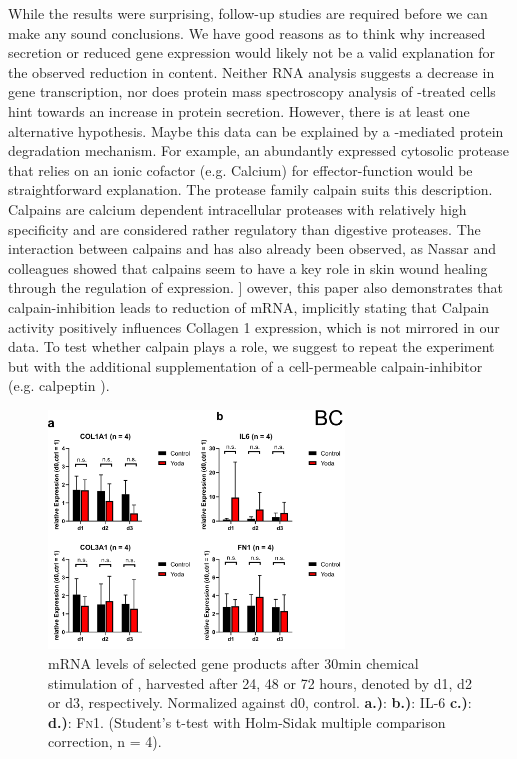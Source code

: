 While the results were surprising, follow-up studies are required before we can make any sound conclusions. We have good reasons as to think why increased secretion or reduced gene expression would likely not be a valid explanation for the observed reduction in \colone{} content. Neither RNA analysis suggests a decrease in gene transcription, nor does protein mass spectroscopy analysis of \Yoda{}-treated cells hint towards an increase in protein secretion. However, there is at least one alternative hypothesis. Maybe this data can be explained by a \Piezo{}-mediated protein degradation mechanism. For example, an abundantly expressed cytosolic protease that relies on an ionic cofactor (e.g. Calcium) for effector-function would be straightforward explanation. The protease family calpain suits this description. \cite{Goll2003} Calpains are calcium dependent intracellular proteases with relatively high specificity and are considered rather regulatory than digestive proteases. The interaction between calpains and \colone has also already been observed, as Nassar and colleagues showed that calpains seem to have a key role in skin wound healing through the regulation of \colone{} expression. \cite{Nassar2012}] owever, this paper also demonstrates that calpain-inhibition leads to reduction of \colone{} mRNA, implicitly stating that Calpain activity positively influences Collagen 1 expression, which is not mirrored in our data. To test whether calpain plays a role, we suggest to repeat the experiment but with the additional supplementation of a cell-permeable calpain-inhibitor (e.g. calpeptin \cite{Schoenwaelder1999}).

\begin{figure}[ht]
\centering
\includegraphics[width = 0.7\textwidth]{NormalYodaExp_PCR.png}
\caption{mRNA levels of selected gene products after 30min chemical stimulation of \Piezo{}, harvested after 24, 48 or 72 hours, denoted by d1, d2 or d3, respectively. Normalized against d0, control.\hfill \newline
\textbf{a.)}: \colone{}
\textbf{b.)}: IL-6
\textbf{c.)}: \colthree{}
\textbf{d.)}: \textsc{Fn}1. 
(Student's t-test with Holm-Sidak multiple comparison correction, n = 4). 
}
\label{fig:Yoda_Norm_PCR}
\end{figure}


